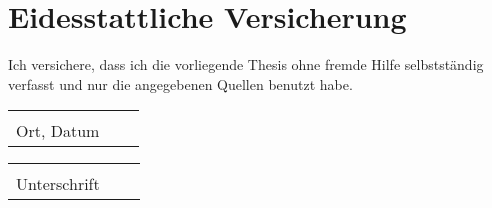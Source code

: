 %
%
\chapter*{Eidesstattliche Versicherung}
\thispagestyle{empty}

Ich versichere, dass ich die vorliegende Thesis ohne fremde Hilfe selbstständig verfasst und nur die angegebenen Quellen benutzt habe.

\vspace{3cm}

\begin{tabular}{p{7cm}p{.5cm}l}
\hrulefill  \\
\centering Ort, Datum
\end{tabular}%
\hfill
\begin{tabular}{p{7cm}p{.5cm}l}
\hrulefill \\
\centering Unterschrift
\end{tabular}%
